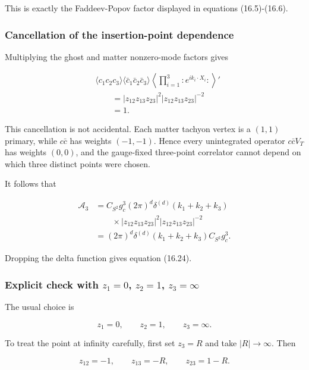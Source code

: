 \documentclass[
  10pt,
  a4paper,
  openany]{book}
\begin{document}
This is exactly the Faddeev-Popov factor displayed in equations
(16.5)-(16.6).

\subsubsection{Cancellation of the insertion-point
dependence}\label{cancellation-of-the-insertion-point-dependence}

Multiplying the ghost and matter nonzero-mode factors gives

\[
\begin{aligned}
&\langle c_1c_2c_3\rangle
\langle\bar c_1\bar c_2\bar c_3\rangle
\left\langle\prod_{i=1}^3:e^{ik_i\cdot X_i}:\right\rangle'\\
&\qquad=
|z_{12}z_{13}z_{23}|^2
|z_{12}z_{13}z_{23}|^{-2}\\
&\qquad=1.
\end{aligned}
\]

This cancellation is not accidental. Each matter tachyon vertex is a
\((1,1)\) primary, while \(c\bar c\) has weights \((-1,-1)\). Hence
every unintegrated operator \(c\bar cV_T\) has weights \((0,0)\), and
the gauge-fixed three-point correlator cannot depend on which three
distinct points were chosen.

It follows that

\[
\begin{aligned}
\mathcal A_3
&=C_{S^2}g_c^3
(2\pi)^d\delta^{(d)}(k_1+k_2+k_3)\\
&\qquad\times
|z_{12}z_{13}z_{23}|^2
|z_{12}z_{13}z_{23}|^{-2}\\
&=(2\pi)^d\delta^{(d)}(k_1+k_2+k_3)
C_{S^2}g_c^3.
\end{aligned}
\]

Dropping the delta function gives equation (16.24).

\subsubsection{\texorpdfstring{Explicit check with \(z_1=0\), \(z_2=1\),
\(z_3=\infty\)}{Explicit check with z\_1=0, z\_2=1, z\_3=\textbackslash infty}}\label{explicit-check-with-z_10-z_21-z_3infty}

The usual choice is

\[
z_1=0,
\qquad
z_2=1,
\qquad
z_3=\infty.
\]

To treat the point at infinity carefully, first set \(z_3=R\) and take
\(|R|\to\infty\). Then

\[
z_{12}=-1,
\qquad
z_{13}=-R,
\qquad
z_{23}=1-R.
\]
\end{document}
